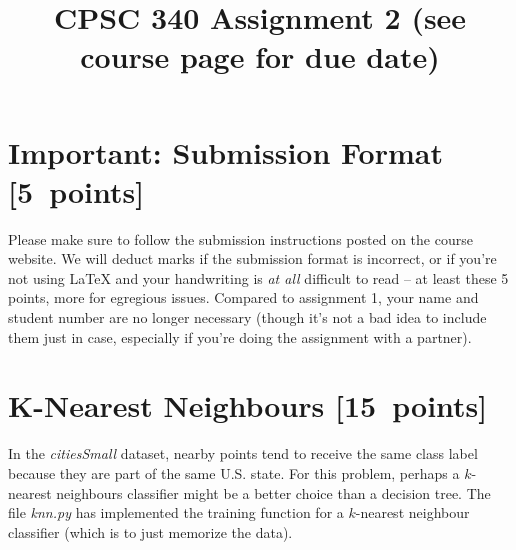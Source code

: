 \documentclass{article}
\newcommand{\blu}[1]{{\textcolor{blu}{#1}}}
\let\ask\blu
\newcommand\pts[1]{\textcolor{pointscolour}{[#1~points]}}
\begin{document}
    \title{CPSC 340 Assignment 2 (see course page for due date)}
    \author{}
    \date{}
    \maketitle
    \vspace{-4em}


    \section*{Important: Submission Format \pts{5}}

    Please make sure to follow the submission instructions posted on the course website.
    \ask{We will deduct marks if the submission format is incorrect, or if you're not using \LaTeX{} and your handwriting is \emph{at all} difficult to read} -- at least these 5 points, more for egregious issues.
    Compared to assignment 1, your name and student number are no longer necessary (though it's not a bad idea to include them just in case, especially if you're doing the assignment with a partner).


    \section{K-Nearest Neighbours \pts{15}}

    In the \emph{citiesSmall} dataset, nearby points tend to receive the same class label because they are part of the same U.S. state. For this problem, perhaps a $k$-nearest neighbours classifier might be a better choice than a decision tree. The file \emph{knn.py} has implemented the training function for a $k$-nearest neighbour classifier (which is to just memorize the data).
\end{document}
